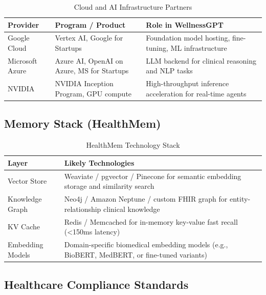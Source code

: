 \documentclass[12pt,a4paper]{article}
\begin{document}
\begin{table}[H]
\centering
\renewcommand{\arraystretch}{1.4}
\begin{tabularx}{\textwidth}{llX}
\toprule
\textbf{Provider} & \textbf{Program / Product} & \textbf{Role in WellnessGPT} \\
\midrule
Google Cloud    & Vertex AI, Google for Startups & Foundation model hosting, fine-tuning, ML infrastructure \\
Microsoft Azure & Azure AI, OpenAI on Azure, MS for Startups & LLM backend for clinical reasoning and NLP tasks \\
NVIDIA          & NVIDIA Inception Program, GPU compute & High-throughput inference acceleration for real-time agents \\
\bottomrule
\end{tabularx}
\caption{Cloud and AI Infrastructure Partners}
\end{table}

\subsection{Memory Stack (HealthMem)}

\begin{table}[H]
\centering
\renewcommand{\arraystretch}{1.4}
\begin{tabularx}{\textwidth}{lX}
\toprule
\textbf{Layer} & \textbf{Likely Technologies} \\
\midrule
Vector Store     & Weaviate / pgvector / Pinecone for semantic embedding storage and similarity search \\
Knowledge Graph  & Neo4j / Amazon Neptune / custom FHIR graph for entity-relationship clinical knowledge \\
KV Cache         & Redis / Memcached for in-memory key-value fast recall (\textless{}150ms latency) \\
Embedding Models & Domain-specific biomedical embedding models (e.g., BioBERT, MedBERT, or fine-tuned variants) \\
\bottomrule
\end{tabularx}
\caption{HealthMem Technology Stack}
\end{table}

\subsection{Healthcare Compliance Standards}
\end{document}
